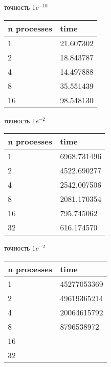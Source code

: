 \documentclass[12pt]{article}
\begin{document}
\noindent
\begin{table*}[!htb]
	\begin{minipage}{.49\linewidth}
		\centering
		\caption*{Область 8x8x8}
		точность $1e^{-10}$
		\begin{tabularx}{\linewidth}{|X|X|}
			\hline
			n processes & time      \\
			\hline
			1           & 21.607302 \\
			2           & 18.843787 \\
			4           & 14.497888 \\
			8           & 35.551439 \\
			16          & 98.548130 \\
			\hline
		\end{tabularx}
	\end{minipage}%
	\begin{minipage}{.49\linewidth}
		\centering
		\caption*{Область 64x64x64}
		точность $1e^{-2}$
		\begin{tabularx}{\linewidth}{|X|X|}
			\hline
			n processes & time        \\
			\hline
			1           & 6968.731496 \\
			2           & 4522.690277 \\
			4           & 2542.007506 \\
			8           & 2081.170354 \\
			16          & 795.745062  \\
			32          & 616.174570  \\
			\hline
		\end{tabularx}
	\end{minipage}

	\begin{minipage}{.49\linewidth}
		\centering
		\caption*{Область 128x128x128}
		точность $1e^{-2}$
		\begin{tabularx}{\linewidth}{|X|X|}
			\hline
			n processes & time        \\
			\hline
			1           & 45277053369 \\
			2           & 49619365214 \\
			4           & 20064615792 \\
			8           & 8796538972 \\
			16          &  \\
			32          &  \\
			\hline
		\end{tabularx}
	\end{minipage}%
\end{table*}

\end{document}
